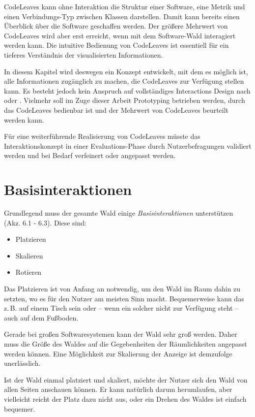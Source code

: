CodeLeaves kann ohne Interaktion die Struktur einer Software, eine Metrik und einen Verbindungs-Typ zwischen Klassen darstellen. Damit kann bereits einen Überblick über die Software geschaffen werden. Der größere Mehrwert von CodeLeaves wird aber erst erreicht, wenn mit dem Software-Wald interagiert werden kann. Die intuitive Bedienung von CodeLeaves ist essentiell für ein tieferes Verständnis der visualisierten Informationen.

In diesem Kapitel wird deswegen ein Konzept entwickelt, mit dem es möglich ist, alle Informationen zugänglich zu machen, die CodeLeaves zur Verfügung stellen kann. Es besteht jedoch kein Anspruch auf vollständiges Interactions Design nach \cite{goodwin2011designing} oder \cite{cooper2014face}. Vielmehr soll im Zuge dieser Arbeit Prototyping betrieben werden, durch das CodeLeaves bedienbar ist und der Mehrwert von CodeLeaves beurteilt werden kann.

Für eine weiterführende Realisierung von CodeLeaves müsste das Interaktionskonzept in einer Evaluations-Phase durch Nutzerbefragungen validiert werden und bei Bedarf verfeinert oder angepasst werden.

\section{Basisinteraktionen}
Grundlegend muss der gesamte Wald einige \textit{Basisinteraktionen} unterstützen (Akz. 6.1 - 6.3). Diese sind:

\begin{itemize}
  \item Platzieren
  \item Skalieren
  \item Rotieren
\end{itemize}

Das Platzieren ist von Anfang an notwendig, um den Wald im Raum dahin zu setzten, wo es für den Nutzer am meisten Sinn macht. Bequemerweise kann das z.\,B. auf einem Tisch sein oder -- wenn ein solcher nicht zur Verfügung steht -- auch auf dem Fußboden.

Gerade bei großen Softwaresystemen kann der Wald sehr groß werden. Daher muss die Größe des Waldes auf die Gegebenheiten der Räumlichkeiten angepasst werden können. Eine Möglichkeit zur Skalierung der Anzeige ist demzufolge unerlässlich.

Ist der Wald einmal platziert und skaliert, möchte der Nutzer sich den Wald von allen Seiten anschauen können. Er kann natürlich darum herumlaufen, aber vielleicht reicht der Platz dazu nicht aus, oder ein Drehen des Waldes ist einfach bequemer.

